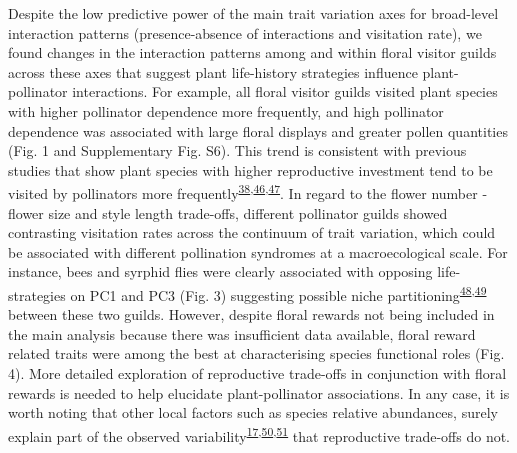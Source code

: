 \documentclass[
  12pt,
  a4paper,
]{article}
\begin{document}
Despite the low predictive power of the main trait variation axes for broad-level interaction patterns (presence-absence of interactions and visitation rate), we found changes in the interaction patterns among and within floral visitor guilds across these axes that suggest plant life-history strategies influence plant-pollinator interactions. For example, all floral visitor guilds visited plant species with higher pollinator dependence more frequently, and high pollinator dependence was associated with large floral displays and greater pollen quantities (Fig. 1 and Supplementary Fig. S6). This trend is consistent with previous studies that show plant species with higher reproductive investment tend to be visited by pollinators more frequently\textsuperscript{\protect\hyperlink{ref-lazaro2013}{38},\protect\hyperlink{ref-hegland2005}{46},\protect\hyperlink{ref-kaiser2014}{47}}. In regard to the flower number - flower size and style length trade-offs, different pollinator guilds showed contrasting visitation rates across the continuum of trait variation, which could be associated with different pollination syndromes at a macroecological scale. For instance, bees and syrphid flies were clearly associated with opposing life-strategies on PC1 and PC3 (Fig. 3) suggesting possible niche partitioning\textsuperscript{\protect\hyperlink{ref-palmer2003}{48},\protect\hyperlink{ref-phillips2020}{49}} between these two guilds. However, despite floral rewards not being included in the main analysis because there was insufficient data available, floral reward related traits were among the best at characterising species functional roles (Fig. 4). More detailed exploration of reproductive trade-offs in conjunction with floral rewards is needed to help elucidate plant-pollinator associations. In any case, it is worth noting that other local factors such as species relative abundances, surely explain part of the observed variability\textsuperscript{\protect\hyperlink{ref-bartomeus2016}{17},\protect\hyperlink{ref-vazquez2007}{50},\protect\hyperlink{ref-encinas2012}{51}} that reproductive trade-offs do not.
\end{document}
